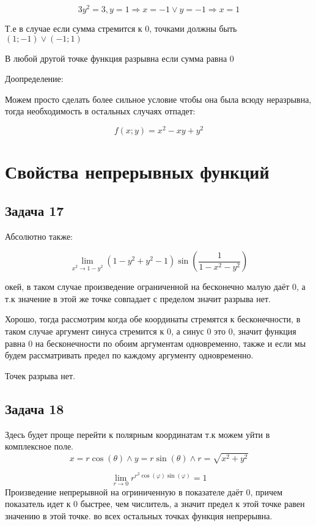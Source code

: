 \documentclass[a4paper,12pt]{article}
\begin{document}
\[
3y^2=3, y=1 \Rightarrow x =-1 \lor y=-1 \Rightarrow x=1
\]

Т.е в случае если сумма стремится к 0, точками должны быть $(1;-1) \lor (-1;1)$

В любой другой точке функция разрывна если сумма равна 0

Доопределение: 

Можем просто сделать более сильное условие чтобы она была всюду неразрывна, тогда необходимость в остальных случаях отпадет: 

\[
f(x;y) = x^2-xy+y^2
\]

\section{Свойства непрерывных функций}

\subsection{Задача 17}
Абсолютно также:

\[
\lim_{x^2 \to 1-y^2} (1-y^2+y^2-1)\sin(\frac{1}{1-x^2-y^2})
\]

окей, в таком случае произведение ограниченной на бесконечно малую даёт 0, а т.к значение в этой же точке совпадает с пределом значит разрыва нет.

Хорошо, тогда рассмотрим когда обе координаты стремятся к бесконечности, в таком случае аргумент синуса стремится к 0, а синус 0 это 0, значит функция равна 0 на бесконечности по обоим аргументам одновременно, также и если мы будем рассматривать предел по каждому аргументу одновременно. 

Точек разрыва нет.

\subsection{Задача 18}
Здесь будет проще перейти к полярным координатам т.к можем уйти в комплексное поле.
\[
x = r\cos(\theta) \land y = r\sin(\theta) \land r = \sqrt{x^2+y^2} 
\]

\[
\lim_{r \to 0} r^{r^2\cos(\varphi)\sin(\varphi)}=1
\]
Произведение непрерывной на огриниченную в показателе даёт 0, причем показатель идет к 0 быстрее, чем числитель, а значит предел к этой точке равен значению в этой точке. во всех остальных точках функция непрерывна.
\end{document}
